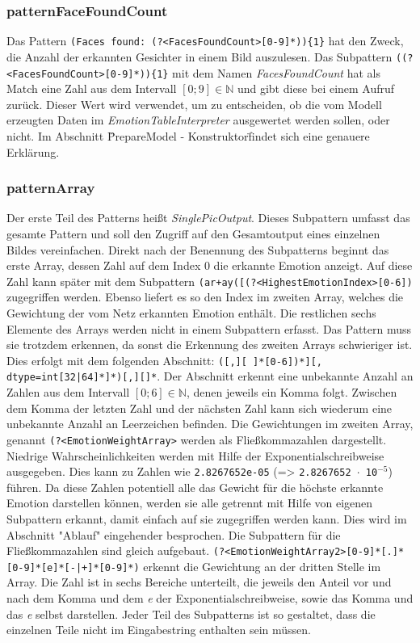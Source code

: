 \documentclass[12pt,a4paper,headinclude,twoside, plainheadsepline, open=right,numbers=noenddot]{scrreprt}
\begin{document}
\subsubsection{patternFaceFoundCount}
Das Pattern \texttt{(Faces found:  (?<FacesFoundCount>[0-9]*))\{1\}} hat den Zweck, die Anzahl der erkannten Gesichter in einem Bild auszulesen. Das Subpattern \texttt{((?<FacesFoundCount>[0-9]*))\{1\}} mit dem Namen \textit{FacesFoundCount} hat als Match eine Zahl aus dem Intervall $\left[0;9\right] \in \mathbb{N}$ und gibt diese bei einem Aufruf zur\"{u}ck. Dieser Wert wird verwendet, um zu entscheiden, ob die vom Modell erzeugten Daten im \textit{EmotionTableInterpreter} ausgewertet werden sollen, oder nicht. Im Abschnitt \"PrepareModel - Konstruktor\" findet sich eine genauere Erkl\"{a}rung.
\subsubsection{patternArray}
Der erste Teil des Patterns hei{\ss}t \textit{SinglePicOutput}. Dieses Subpattern umfasst das gesamte Pattern und soll den 
Zugriff auf den Gesamtoutput eines einzelnen Bildes vereinfachen. Direkt nach der Benennung des Subpatterns beginnt 
das erste Array, dessen Zahl auf dem Index 0 die erkannte Emotion anzeigt. Auf diese Zahl kann sp\"{a}ter mit dem Subpattern 
\texttt{(ar+ay([(?<HighestEmotionIndex>[0-6])} zugegriffen werden.  Ebenso liefert es so den Index im zweiten Array, 
welches die Gewichtung der vom Netz erkannten Emotion enth\"{a}lt. Die restlichen sechs Elemente des Arrays werden nicht in 
einem Subpattern erfasst. Das Pattern muss sie trotzdem erkennen, da  sonst die Erkennung des zweiten Arrays 
schwieriger ist. Dies erfolgt mit dem folgenden Abschnitt: \texttt{([,][ ]*[0-6])*][, dtype=int[32|64]*]*)[,][]*}. Der Abschnitt 
erkennt eine unbekannte Anzahl an Zahlen aus dem Intervall $\left[0;6\right] \in \mathbb{N}$, denen jeweils ein Komma 
folgt. Zwischen dem Komma der letzten Zahl und der n\"{a}chsten Zahl kann sich wiederum eine unbekannte Anzahl an 
Leerzeichen befinden.
Die Gewichtungen im zweiten Array, genannt \texttt{(?<EmotionWeightArray>} werden als Flie{\ss}kommazahlen 
dargestellt. Niedrige Wahrscheinlichkeiten werden mit Hilfe der Exponentialschreibweise ausgegeben. Dies kann zu Zahlen 
wie \texttt{2.8267652e-05} (=> \texttt{2.8267652 $\cdot$ 10$^{-5}$}) f\"{u}hren. Da diese Zahlen potentiell alle das Gewicht 
f\"{u}r die h\"{o}chste erkannte Emotion darstellen k\"{o}nnen, werden sie alle getrennt mit Hilfe von eigenen Subpattern erkannt, 
damit einfach auf sie zugegriffen werden kann. Dies wird im Abschnitt "{}Ablauf"{}  eingehender besprochen. Die Subpattern 
f\"{u}r die Flie{\ss}kommazahlen sind gleich aufgebaut. \texttt{(?<EmotionWeightArray2>[0-9]*[.]*[0-9]*[e]*[-|+]*[0-9]*)} 
erkennt die Gewichtung an der dritten Stelle im Array. Die Zahl ist in sechs Bereiche unterteilt, die jeweils den Anteil vor und  
nach dem Komma und dem \textit{e} der Exponentialschreibweise, sowie das Komma und das  \textit{e} selbst darstellen. 
Jeder Teil des Subpatterns ist so gestaltet, dass die einzelnen Teile nicht im Eingabestring enthalten sein m\"{u}ssen.
\end{document}
